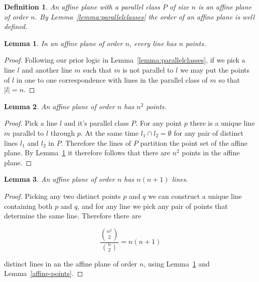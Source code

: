 \documentclass{article}
\newtheorem{lemma}{Lemma}
\newtheorem{definition}{Definition}
\begin{document}
\begin{definition}\label{definition:affine-order}
An affine plane with a parallel class \(P\) of size \(n\) is an affine plane of order \(n\). By Lemma~\ref{lemma:parallelclasses} the order of an affine plane is well defined.
\end{definition}

\begin{lemma}\label{lemma:affine-lines}
  In an affine plane of order \(n\), every line has \(n\) points.
\end{lemma}
\begin{proof}
  Following our prior logic in Lemma~\ref{lemma:parallelclasses}, if we pick a line \(l\) and another line \(m\) such that \(m\) is not parallel to \(l\) we may put the points of \(l\) in one to one correspondence with lines in the parallel class of \(m\) so that \(|l| = n\).
\end{proof}

\begin{lemma}\label{lemma:affine-points}
  An affine plane of order \(n\) has \(n^{2}\) points.
\end{lemma}
\begin{proof}
  Pick a line \(l\) and it's parallel class \(P\). For any point \(p\) there is a unique line \(m\) parallel to \(l\) through \(p\). At the same time \(l_{1} \cap l_{2} = \emptyset\) for any pair of distinct lines \(l_{1}\) and \(l_{2}\) in \(P\). Therefore the lines of \(P\) partition the point set of the affine plane.
  By Lemma~\ref{lemma:affine-lines} it therefore follows that there are \(n^{2}\) points in the affine plane.
\end{proof}

\begin{lemma}
  An affine plane of order \(n\) has \(n(n + 1)\) lines.
\end{lemma}

\begin{proof}
  Picking any two distinct points \(p\) and \(q\) we can construct a unique line containing both \(p\) and \(q\), and for any line we pick any pair of points that determine the same line. Therefore there are

  \begin{equation*}
    \frac{\binom{n^{2}}{2}}{\binom{n}{2}} = n(n + 1)
  \end{equation*}

  distinct lines in an the affine plane of order \(n\), using Lemma~\ref{lemma:affine-lines} and Lemma~\ref{affine-points}.
\end{proof}
\end{document}
